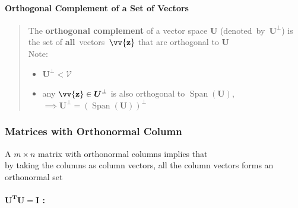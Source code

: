 \documentclass[11pt]{article}
\DeclareRobustCommand{\myvec}[1]{\vv{\mathbf{#1}}}
\newcommand{\myvecsp}[1]{\bm{\mathcal{#1}}}
\newcommand{\mysubvecsp}[1]{\bm{{#1}}}
\newcommand{\mymat}[1]{#1}
\begin{document}
    \paragraph{Orthogonal Complement of a Set of Vectors} 
    
    \begin{quote}
        The \textbf{orthogonal complement} of a vector space $\mysubvecsp{U}$ (denoted~by~$\mysubvecsp{U}^{\perp}$) is the set of \textbf{all}~vectors~$\myvec{z}$ that are orthogonal to $\mysubvecsp{U}$ \\
        \vspace{1ex}
        Note:
        \begin{itemize}
            \item $\mysubvecsp{U}^{\perp} < \myvecsp{V}$
            \item any $\myvec{z} \in \mysubvecsp{U}^{\perp}$ is also orthogonal to $\operatorname{Span}(\mysubvecsp{U})$, $\implies \mysubvecsp{U}^{\perp} = (\operatorname{Span}(\mysubvecsp{U}))^{\perp}$
        \end{itemize}
    \end{quote}
    
    \newpage
    \subsubsection{Matrices with Orthonormal Column} \label{section3_5_3}
    A $m \times n$ matrix with orthonormal columns implies that \\
    by taking the columns as column vectors, all the column vectors forms an orthonormal set
    
    \paragraph{$\bm{\mymat{U}^T \mymat{U} = \mymat{I}}$ :}\mbox{}\vspace{1ex}
\end{document}
